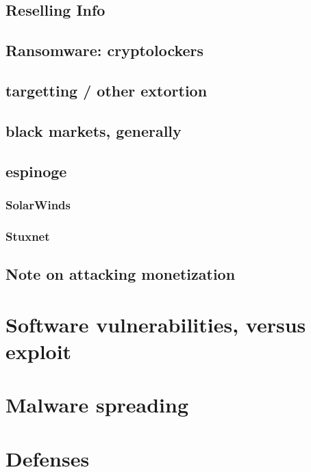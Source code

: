 \subsection{Reselling Info}


\subsection{Ransomware: cryptolockers}


\subsection{targetting / other extortion}


\subsection{black markets, generally}


\subsection{espinoge}


\subsubsection{SolarWinds}


\subsubsection{Stuxnet}


\subsection{Note on attacking monetization}


\section{Software vulnerabilities, versus exploit}


\section{Malware spreading}


\section{Defenses}



